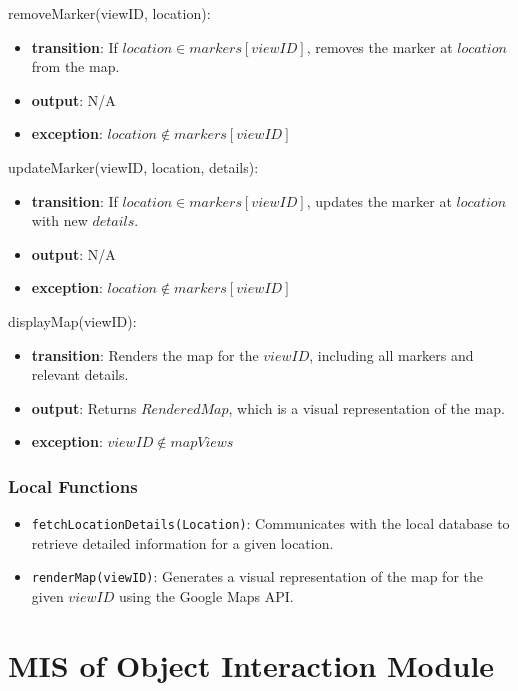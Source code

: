 \documentclass[12pt, titlepage]{article}
\begin{document}
\noindent removeMarker(viewID, location):
\begin{itemize}
  \item \textbf{transition}:
        If \( location \in markers[viewID] \), removes the marker at \( location \) from the map.
  \item \textbf{output}: N/A
  \item \textbf{exception}: \( location \notin markers[viewID] \)
\end{itemize}

\noindent updateMarker(viewID, location, details):
\begin{itemize}
  \item \textbf{transition}:
        If \( location \in markers[viewID] \), updates the marker at \( location \) with new \( details \).
  \item \textbf{output}: N/A
  \item \textbf{exception}: \( location \notin markers[viewID] \)
\end{itemize}

\noindent displayMap(viewID):
\begin{itemize}
  \item \textbf{transition}:
        Renders the map for the \( viewID \), including all markers and relevant details.
  \item \textbf{output}: Returns \( RenderedMap \), which is a visual representation of the map.
  \item \textbf{exception}: \( viewID \notin mapViews \)
\end{itemize}

\subsubsection{Local Functions}

\begin{itemize}
  \item \texttt{fetchLocationDetails(Location)}: Communicates with the local database to retrieve detailed information for a given location.
  \item \texttt{renderMap(viewID)}: Generates a visual representation of the map for the given \( viewID \) using the Google Maps API.
\end{itemize}

\newpage

\section{MIS of Object Interaction Module} \label{object-interaction}
\end{document}
